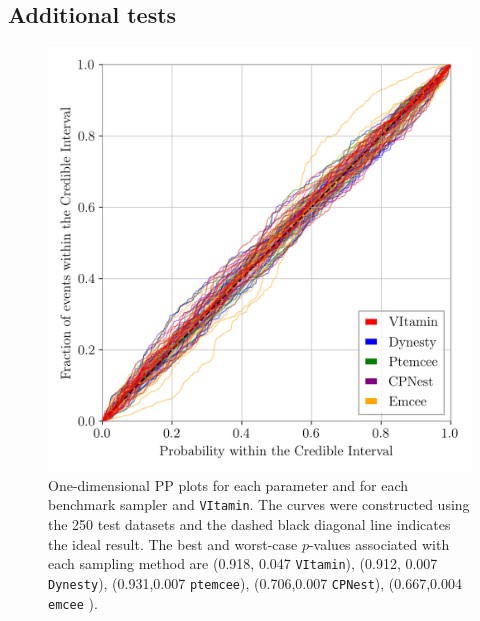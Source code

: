 \documentclass[%
showpacs,
nofootinbib,
 amsmath,amssymb,
 aps,
 twocolumn,
 prl,
 reprint,
floatfix,
]{revtex4-1}
\begin{document}
\subsection{Additional tests}
%
%
\begin{figure}
    \includegraphics[width=\columnwidth]{latest_pp_plot.png}
    \caption{\label{fig:pp_plot} One-dimensional \ac{PP} plots for each
parameter and for each benchmark sampler and \texttt{VItamin}. The curves were
constructed using the 250 test datasets and the dashed black diagonal line
indicates the ideal result. The best and worst-case $p$-values associated with each
sampling method are (0.918,  0.047 \texttt{VItamin}), (0.912, 0.007 \texttt{Dynesty}), (0.931,0.007
\texttt{ptemcee}), (0.706,0.007 \texttt{CPNest}), (0.667,0.004 \texttt{emcee} ). 
}
\end{figure}
%
\end{document}
